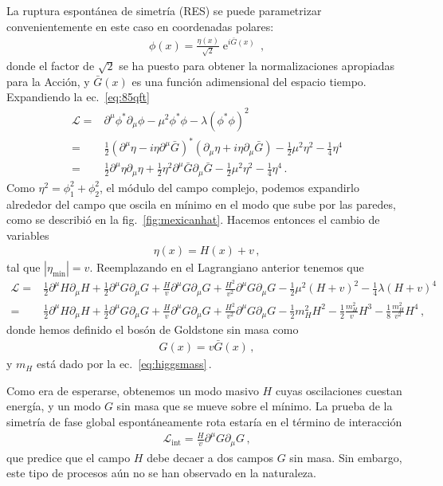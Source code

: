 \begin{frame}
La ruptura espontánea de simetría (RES) se puede parametrizar convenientemente en este caso en coordenadas polares:
\begin{align}
  \phi(x)=\frac{\eta(x)}{\sqrt{2}} \operatorname{e}^{i\bar{G}(x)}\,,
\end{align}
donde el factor de $\sqrt{2}$ se ha puesto para obtener la normalizaciones apropiadas para la Acción, y $\bar{G}(x)$ es una función adimensional del espacio tiempo. Expandiendo la ec.~\eqref{eq:85qft}
\begin{align}
    \mathcal{L}=&\partial^\mu\phi^*\partial_\mu\phi-\mu^2\phi^*\phi-\lambda(\phi^*\phi)^2 \nonumber\\
=&\frac{1}{2}\left( \partial^{\mu}\eta-i\eta \partial^{\mu}\bar{G} \right)^{*}\left(\partial_{\mu}\eta+i\eta \partial_{\mu}\bar{G}  \right)
-\frac{1}{2}\mu^2 \eta^2 -\frac{1}{4}\eta^4 \nonumber\\
=&\frac{1}{2}\partial^{\mu}\eta\partial_{\mu}\eta+\frac{1}{2}\eta^2 \partial^{\mu}\bar{G}\partial_{\mu}\bar{G} 
-\frac{1}{2}\mu^2 \eta^2 -\frac{1}{4}\eta^4 \,.
\end{align}
 Como $\eta^2=\phi_1^2+\phi_2^2$, el módulo del campo complejo, podemos expandirlo  alrededor del campo que oscila en mínimo en el modo que sube por las paredes, como se describió en la fig.~\ref{fig:mexicanhat}. Hacemos entonces el cambio de variables
 \begin{align}
   \eta(x)=H(x)+v\,,
 \end{align}
tal que $|\eta_{\text{min}}|=v$. Reemplazando en el Lagrangiano anterior tenemos que
\begin{align}
  \mathcal{L}=&\frac{1}{2}\partial^{\mu}H\partial_{\mu}H+\frac{1}{2}\partial^{\mu}G\partial_{\mu}G+\frac{H}{v}\partial^{\mu}G\partial_{\mu}G+\frac{H^2}{v^2}\partial^{\mu}G\partial_{\mu}G
-\tfrac{1}{2}\mu^2(H+v)^2-\tfrac{1}{4}\lambda(H+v)^4 \nonumber\\
=&  \frac{1}{2}\partial^{\mu}H\partial_{\mu}H+\frac{1}{2}\partial^{\mu}G\partial_{\mu}G+\frac{H}{v}\partial^{\mu}G\partial_{\mu}G+\frac{H^2}{v^2}\partial^{\mu}G\partial_{\mu}G-\frac{1}{2}m_H^2H^2-\frac{1}{2}\frac{m_H^2}{v}H^3-\frac{1}{8}\frac{m_H^2}{v^2} H^4\,,
\end{align}
donde hemos definido el bosón de Goldstone sin masa como
\begin{align}
  G(x)=v\bar{G}(x)\,,
\end{align}
y $m_H$ está dado por la ec.~\eqref{eq:higgsmass}\,.

Como era de esperarse, obtenemos un modo masivo $H$ cuyas oscilaciones cuestan energía, y un modo $G$ sin masa que se mueve sobre el mínimo. La prueba de la simetría de fase global espontáneamente rota estaría en el término de interacción
\begin{align}
  \mathcal{L}_{\text{int}}=\frac{H}{v}\partial^{\mu}G\partial_{\mu}G\,,
\end{align}
que predice que el campo $H$ debe decaer a dos campos $G$ sin masa. Sin embargo, este tipo de procesos aún no se han observado en la naturaleza. 
\end{frame}

